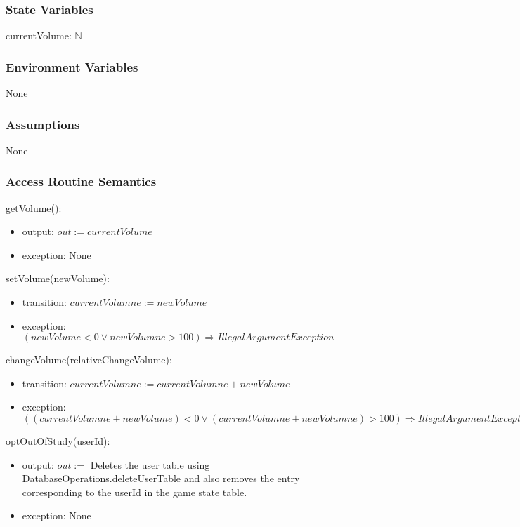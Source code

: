 \documentclass[12pt, titlepage]{article}
\begin{document}
\subsubsection{State Variables}
currentVolume: $\mathbb{N}$
\subsubsection{Environment Variables}
None
\subsubsection{Assumptions}
None

\subsubsection{Access Routine Semantics}

\noindent getVolume():
\begin{itemize}
\item output: $out := currentVolume$ 
\item exception: None
\end{itemize}

\noindent setVolume(newVolume):
\begin{itemize}
\item transition: $currentVolumne := newVolume$ 
\item exception: $(newVolume < 0 \lor newVolumne > 100 ) \Rightarrow IllegalArgumentException $
\end{itemize}

\noindent changeVolume(relativeChangeVolume):
\begin{itemize}
\item transition: $currentVolumne := currentVolumne + newVolume$ 
\item exception: $((currentVolumne + newVolume) < 0 \lor (currentVolumne + newVolumne) > 100 ) \Rightarrow IllegalArgumentException $
\end{itemize}

\noindent optOutOfStudy(userId):
\begin{itemize}
\item output: $out := $ Deletes the user table using DatabaseOperations.deleteUserTable and also removes the entry corresponding to the userId in the game state table.
\item exception: None
\end{itemize}
\medskip
\newpage
\end{document}
